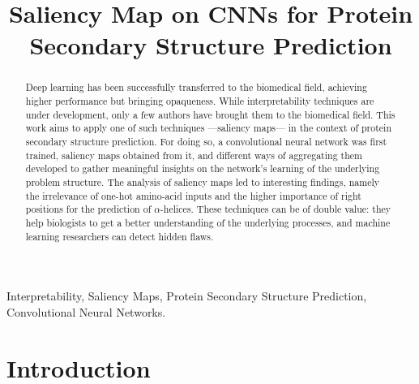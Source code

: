 \documentclass{article}
\title{Saliency Map on CNNs for Protein Secondary Structure	Prediction}
\begin{document}
%
\maketitle
%
\begin{abstract}

Deep learning has been successfully transferred to the biomedical field, achieving higher performance but bringing opaqueness.
While interpretability techniques are under development, only a few authors have brought them to the biomedical field.
This work aims to apply one of such techniques ---saliency maps--- in the context of protein secondary structure prediction.
For doing so, a convolutional neural network was first trained, saliency maps obtained from it, and different ways of aggregating them developed to gather meaningful insights on the network's learning of the underlying problem structure.
The analysis of saliency maps led to interesting findings, namely the irrelevance of one-hot amino-acid inputs and the higher importance of right positions for the prediction of $\alpha$-helices.
These techniques can be of double value: they help biologists to get a better understanding of the underlying processes, and machine learning researchers can detect hidden flaws.
\end{abstract}
%
\begin{keywords}
Interpretability, Saliency Maps, Protein Secondary Structure Prediction, Convolutional Neural Networks.
\end{keywords}
%
\section{Introduction}
\label{sec:intro}


\end{document}
